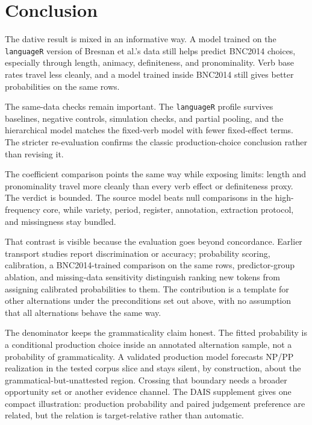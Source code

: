 \section{Conclusion}

The dative result is mixed in an informative way. A model trained on the
\texttt{languageR} version of Bresnan et al.'s data still helps predict
BNC2014 choices, especially through length, animacy, definiteness, and
pronominality. Verb base rates travel less cleanly, and a model trained inside
BNC2014 still gives better probabilities on the same rows.

The same-data checks remain important. The \texttt{languageR} profile survives
baselines, negative controls, simulation checks, and partial pooling, and the
hierarchical model matches the fixed-verb model with fewer fixed-effect terms.
The stricter re-evaluation confirms the classic production-choice conclusion
rather than revising it.

The coefficient comparison points the same way while exposing limits: length
and pronominality travel more cleanly than every verb effect or definiteness
proxy. The verdict is bounded. The source model beats null comparisons in the
high-frequency core, while variety, period, register, annotation, extraction
protocol, and missingness stay bundled.

That contrast is visible because the evaluation goes beyond concordance. Earlier
transport studies report discrimination or accuracy; probability scoring,
calibration, a BNC2014-trained comparison on the same rows, predictor-group
ablation, and missing-data sensitivity distinguish ranking new tokens from
assigning calibrated probabilities to them. The contribution is a template for
other alternations under the preconditions set out above, with no assumption that
all alternations behave the same way.

The denominator keeps the grammaticality claim honest. The fitted probability is a
conditional production choice inside an annotated alternation sample, not a
probability of grammaticality. A validated production model forecasts NP/PP
realization in the tested corpus slice and stays silent, by construction, about
the grammatical-but-unattested region. Crossing that boundary needs a broader
opportunity set or another evidence channel. The DAIS supplement gives one
compact illustration: production probability and paired judgement preference are
related, but the relation is target-relative rather than automatic.
